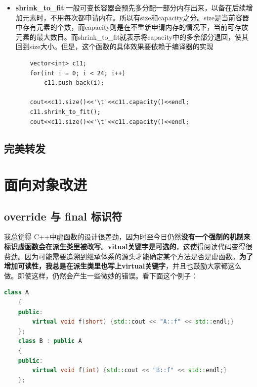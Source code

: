 \documentclass[UTF8,a4paper,12pt]{ctexbook} %
\begin{document}
\begin{itemize}
						可以通过如下方式，获取\verb|tuple|中的元素、\verb|tuple|的长度等：
						\begin{lstlisting}
	//tuple<int, string, vector<int>> c14 = {1, "tuple", {0, 1, 2, 3, 4}}; // wrong. must explicit initialize
							
	tuple<int, string, vector<int>> c14{1, "tuple", {0, 1, 2, 3, 4}};
							
	get<0>(c14) = 2;	// 赋值-修改值
	typedef decltype(c14) ctype;
	size_t sz = tuple_size<ctype>::value;
	cout<<get<0>(c14)<<'\t'<<get<1>(c14)<<'\t'<<get<2>(c14)[0]<<'\t'<<sz<<endl;
						\end{lstlisting}
						
						\item \textbf{shrink\_to\_fit}:一般可变长容器会预先多分配一部分内存出来，以备在后续增加元素时，不用每次都申请内存。所以有size和capacity之分。size是当前容器中存有元素的个数，而capacity则是在不重新申请内存的情况下，当前可存放元素的最大数目。而shrink\_to\_fit就表示将capacity中的多余部分退回，使其回到size大小。但是，这个函数的具体效果要依赖于编译器的实现
						\begin{lstlisting}
	vector<int> c11;
	for(int i = 0; i < 24; i++)
		c11.push_back(i);
								
	cout<<c11.size()<<'\t'<<c11.capacity()<<endl;
	c11.shrink_to_fit();
	cout<<c11.size()<<'\t'<<c11.capacity()<<endl;
						\end{lstlisting}
					\end{itemize}
		\subsection{完美转发}	

	\section{面向对象改进}
		\subsection{override 与 final 标识符}
			我总觉得 C++中虚函数的设计很差劲，因为时至今日仍然\textbf{没有一个强制的机制来标识虚函数会在派生类里被改写}。\textbf{vitual关键字是可选的}，这使得阅读代码变得很费劲。因为可能需要追溯到继承体系的源头才能确定某个方法是否是虚函数。\textbf{为了增加可读性，我总是在派生类里也写上virtual关键字}，并且也鼓励大家都这么做。即使这样，仍然会产生一些微妙的错误。看下面这个例子：
			\begin{lstlisting}[language=C++]
	class A 
	{
	public:
		virtual void f(short) {std::cout << "A::f" << std::endl;}
	};
	class B : public A
	{
	public:
		virtual void f(int) {std::cout << "B::f" << std::endl;}
	};			
			\end{lstlisting}
			
\end{document}
